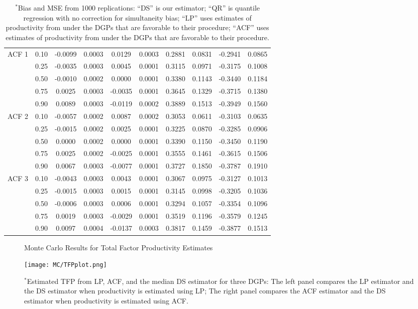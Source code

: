\documentclass[12pt]{article}
\begin{document}
\begin{table}[H]
\begin{tabular}{cccccccccc}
   \hline
ACF 1 & 0.10 & -0.0099 & 0.0003 & 0.0129 & 0.0003 & 0.2881 & 0.0831 & -0.2941 & 0.0865 \\ 
   & 0.25 & -0.0035 & 0.0003 & 0.0045 & 0.0001 & 0.3115 & 0.0971 & -0.3175 & 0.1008 \\ 
   & 0.50 & -0.0010 & 0.0002 & 0.0000 & 0.0001 & 0.3380 & 0.1143 & -0.3440 & 0.1184 \\ 
   & 0.75 & 0.0025 & 0.0003 & -0.0035 & 0.0001 & 0.3645 & 0.1329 & -0.3715 & 0.1380 \\ 
   & 0.90 & 0.0089 & 0.0003 & -0.0119 & 0.0002 & 0.3889 & 0.1513 & -0.3949 & 0.1560 \\ 
  ACF 2 & 0.10 & -0.0057 & 0.0002 & 0.0087 & 0.0002 & 0.3053 & 0.0611 & -0.3103 & 0.0635 \\ 
   & 0.25 & -0.0015 & 0.0002 & 0.0025 & 0.0001 & 0.3225 & 0.0870 & -0.3285 & 0.0906 \\ 
   & 0.50 & 0.0000 & 0.0002 & 0.0000 & 0.0001 & 0.3390 & 0.1150 & -0.3450 & 0.1190 \\ 
   & 0.75 & 0.0025 & 0.0002 & -0.0025 & 0.0001 & 0.3555 & 0.1461 & -0.3615 & 0.1506 \\ 
   & 0.90 & 0.0067 & 0.0003 & -0.0077 & 0.0001 & 0.3727 & 0.1850 & -0.3787 & 0.1910 \\ 
  ACF 3 & 0.10 & -0.0043 & 0.0003 & 0.0043 & 0.0001 & 0.3067 & 0.0975 & -0.3127 & 0.1013 \\ 
   & 0.25 & -0.0015 & 0.0003 & 0.0015 & 0.0001 & 0.3145 & 0.0998 & -0.3205 & 0.1036 \\ 
   & 0.50 & -0.0006 & 0.0003 & 0.0006 & 0.0001 & 0.3294 & 0.1057 & -0.3354 & 0.1096 \\ 
   & 0.75 & 0.0019 & 0.0003 & -0.0029 & 0.0001 & 0.3519 & 0.1196 & -0.3579 & 0.1245 \\ 
   & 0.90 & 0.0097 & 0.0004 & -0.0137 & 0.0003 & 0.3817 & 0.1459 & -0.3877 & 0.1513 \\ 
   \hline
\end{tabular}
\caption*{\footnotesize $^{*}$Bias and MSE from 1000 replications: ``DS'' is our estimator; ``QR'' is quantile regression with no correction for simultaneity bias; ``LP'' uses estimates of productivity from \cite{Levinsohn2003} under the DGPs that are favorable to their procedure; ``ACF'' uses estimates of productivity from \cite{Ackerberg2015} under the DGPs that are favorable to their procedure.}
\label{simresults}
\end{table}
\pagebreak
\newpage

\begin{figure}[H]
\centering
\caption{Monte Carlo Results for Total Factor Productivity Estimates}
\texttt{[image: MC/TFPplot.png]}
\caption*{\footnotesize $^{*}$Estimated TFP from LP, ACF, and the median DS estimator for three DGPs: The left panel compares the LP estimator and the DS estimator when productivity is estimated using LP; The right panel compares the ACF estimator and the DS estimator when productivity is estimated using ACF.}
\label{fig:MCTFP}
\end{figure}
\end{document}
